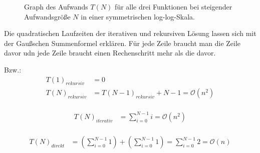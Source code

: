 \documentclass[paper=a4, fontsize=11pt]{scrartcl} %
\numberwithin{equation}{section} %
\numberwithin{figure}{section} %
\numberwithin{table}{section} %
\begin{document}
\begin{figure}[h]
  \centering
  \caption{Graph des Aufwands $T(N)$ f\"ur alle drei Funktionen bei steigender Aufwandsgr\"o{\ss}e $N$ in einer symmetrischen log-log-Skala.}
  \label{figure:loglogeq}
\end{figure}

Die quadratischen Laufzeiten der iterativen und rekursiven L\"osung lassen sich
mit der Gau{\ss}schen Summenformel erkl\"aren. F\"ur jede Zeile braucht man die
Zeile davor udn jede Zeile braucht einen Rechenschritt mehr als die davor.

Bzw.:
\begin{equation}
  \begin{split}
    T(1)_{rekursiv} &= 0 \\
    T(N)_{rekursiv} &= T(N-1)_{rekursiv} + N - 1 = \mathcal{O}(n^2)\\
  \end{split}
\end{equation}

\begin{equation}
  \begin{split}
    T(N)_{iterativ} &= \sum_{i=0}^{N-1} i = \mathcal{O}(n^2)\\
  \end{split}
\end{equation}

\begin{equation}
  \begin{split}
    T(N)_{direkt} &= \left(\sum_{i=0}^{N-1} 1\right) + \left(\sum_{i=0}^{N-1} 1\right) = \sum_{i=0}^{N-1} 2 = \mathcal{O}(n)\\
  \end{split}
\end{equation}
\end{document}
